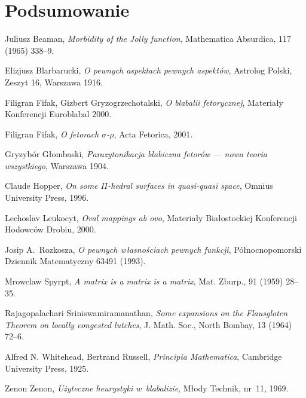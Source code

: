 \documentclass[licencjacka]{pracamgr}
\begin{document}
\chapter{Podsumowanie}\label{r:pods}
\begin{thebibliography}{99}

 Juliusz Beaman, \textit{Morbidity of the Jolly
    function}, Mathematica Absurdica, 117 (1965) 338--9.

 Elizjusz Blarbarucki, \textit{O pewnych
    aspektach pewnych aspektów}, Astrolog Polski, Zeszyt 16, Warszawa
  1916.

 Filigran Fifak, Gizbert Gryzogrzechotalski,
  \textit{O blabalii fetorycznej}, Materiały Konferencji Euroblabal
  2000.

 Filigran Fifak, \textit{O fetorach
    $\sigma$-$\rho$}, Acta Fetorica, 2001.

 Gryzybór Głombaski, \textit{Parazytonikacja
    blabiczna fetorów --- nowa teoria wszystkiego}, Warszawa 1904.

 Claude Hopper, \textit{On some $\Pi$-hedral
    surfaces in quasi-quasi space}, Omnius University Press, 1996.

 Lechoslav Leukocyt, \textit{Oval mappings ab ovo},
  Materiały Białostockiej Konferencji Hodowców Drobiu, 2000.

 Josip A.~Rozkosza, \textit{O pewnych własnościach
    pewnych funkcji}, Północnopomorski Dziennik Matematyczny 63491
  (1993).

 Mrowclaw Spyrpt, \textit{A matrix is a matrix
    is a matrix}, Mat. Zburp., 91 (1959) 28--35.

 Rajagopalachari Sriniswamiramanathan,
  \textit{Some expansions on the Flausgloten Theorem on locally
    congested lutches}, J. Math.  Soc., North Bombay, 13 (1964) 72--6.

 Alfred N. Whitehead, Bertrand Russell,
  \textit{Principia Mathematica}, Cambridge University Press, 1925.

 Zenon Zenon, \textit{Użyteczne heurystyki
    w~blabalizie}, Młody Technik, nr~11, 1969.

\end{thebibliography}
\end{document}
